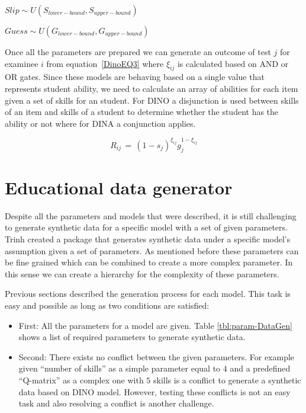 \begin{center}
$Slip \sim \textit{U}(S_{lower-bound}, S_{upper-bound})$

$Guess \sim \textit{U}(G_{lower-bound}, G_{upper-bound})$
\end{center}

Once all the parameters are prepared we can generate an outcome of test $j$ for examinee $i$ from equation~\ref{DinoEQ3} where $\xi_{ij}$ is calculated based on AND or OR gates. Since these models are behaving based on a single value that represents student ability, we need to calculate an array of abilities for each item given a set of skills for an student. For DINO a disjunction is used between skills of an item and skills of a student to determine whether the student has the ability or not where for DINA a conjunction applies.

\begin{equation}
 R_{ij} \,=\, (1-s_j)^{\xi_{ij}} g_j^{1-\xi_{ij}}
\label{DinoEQ3}
\end{equation}

\section{Educational data generator}

Despite all the parameters and models that were described, it is still challenging to generate synthetic data for a specific model with a set of given parameters. Trinh \citep{Trieu2015} created a package that generates synthetic data under a specific model's assumption given a set of parameters. As mentioned before these parameters can be fine grained which can be combined to create a more complex parameter. In this sense we can create a hierarchy for the complexity of these parameters. 

Previous sections described the generation process for each model. This task is easy and possible as long as two conditions are satisfied: 
\begin{itemize}
\item First: All the parameters for a model are given. Table \ref{tbl:param-DataGen} shows a list of required parameters to generate synthetic data.
\item Second: There exists no conflict between the given parameters. For example given ``number of skills'' as a simple parameter equal to $4$ and a predefined ``Q-matrix'' as a complex one with $5$ skills is a conflict to generate a synthetic data based on DINO model. However, testing these conflicts is not an easy task and also resolving a conflict is another challenge.
\end{itemize} 

